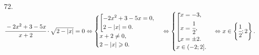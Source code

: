 72. $\cfrac{-2x^2+3-5x}{x+2}\cdot\sqrt{2-|x|}=0\Leftrightarrow\begin{cases}\left[
      \begin{gathered} -2x^2+3-5x=0,\hfill\\
      2-|x|=0.\hfill \end{gathered}\right.\\
      x+2\neq0,\\
2-|x|\geqslant0.\end{cases}\Leftrightarrow\begin{cases}\left[
      \begin{gathered} x=-3,\hfill\\
      x=\cfrac{1}{2},\hfill\\
      x=\pm2.\hfill \end{gathered}\right.\\
      x\in(-2;2].\end{cases}\Leftrightarrow x\in \left \{\cfrac{1}{2};2\right\}.$\\
